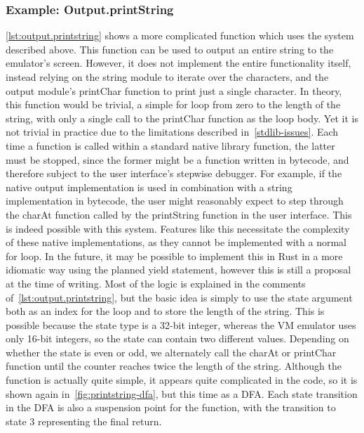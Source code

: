 \subsubsection{Example: Output.printString} \label{complex-example}
\cref{lst:output.printstring} shows a more complicated function which uses the system described above. This function can be used to output an entire string to the emulator's screen. However, it does not implement the entire functionality itself, instead relying on the string module to iterate over the characters, and the output module's printChar function to print just a single character.
In theory, this function would be trivial, a simple for loop from zero to the length of the string, with only a single call to the printChar function as the loop body.
Yet it is not trivial in practice due to the limitations described in~\cref{stdlib-issues}.
Each time a function is called within a standard native library function, the latter must be stopped, since the former might be a function written in bytecode, and therefore subject to the user interface's stepwise debugger.
For example, if the native output implementation is used in combination with a string implementation in bytecode, the user might reasonably expect to step through the charAt function called by the printString function in the user interface.
This is indeed possible with this system.
Features like this necessitate the complexity of these native implementations, as they cannot be implemented with a normal for loop.
In the future, it may be possible to implement this in Rust in a more idiomatic way using the planned yield statement, however this is still a proposal at the time of writing.
Most of the logic is explained in the comments of~\cref{lst:output.printstring}, but the basic idea is simply to use the state argument both as an index for the loop and to store the length of the string. This is possible because the state type is a 32-bit integer, whereas the VM emulator uses only 16-bit integers, so the state can contain two different values.
Depending on whether the state is even or odd, we alternately call the charAt or printChar function until the counter reaches twice the length of the string.
Although the function is actually quite simple, it appears quite complicated in the code, so it is shown again in~\cref{fig:printstring-dfa}, but this time as a DFA.
Each state transition in the DFA is also a suspension point for the function, with the transition to state 3 representing the final return.

